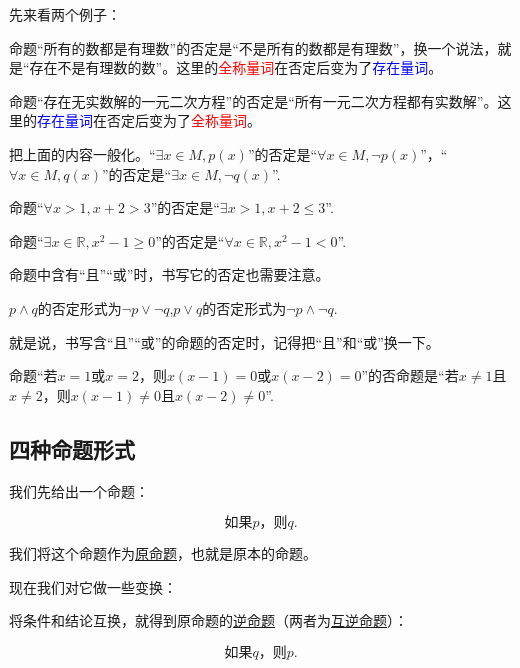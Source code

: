 \documentclass[lang=cn,math=cm,chinesefont=nofont,11pt,scheme=chinese,twocol]{elegantbook}
\begin{document}
先来看两个例子：

命题“所有的数都是有理数”的否定是“不是所有的数都是有理数”，换一个说法，就是“存在不是有理数的数”。这里的\textcolor{red}{全称量词}在否定后变为了\textcolor{blue}{存在量词}。

命题“存在无实数解的一元二次方程”的否定是“所有一元二次方程都有实数解”。这里的\textcolor{blue}{存在量词}在否定后变为了\textcolor{red}{全称量词}。

把上面的内容一般化。“$\exists x\in M, p(x)$”的否定是“$\forall x{\in}M,\neg p(x)$”，“$\forall x\in M, q(x)$”的否定是“$\exists x{\in}M, \neg q(x)$”.

\begin{example}
  命题“$\forall x>1,x+2>3$”的否定是“$\exists x>1,x+2\leqslant 3$”.
\end{example}

\begin{example}
  命题“$\exists x\in\mathbb{R},x^2-1\geqslant 0$”的否定是“$\forall x\in\mathbb{R},x^2-1<0$”.
\end{example}

命题中含有“且”“或”时，书写它的否定也需要注意。

$p\land q$的否定形式为$\lnot p\lor \lnot q$,$p\lor q$的否定形式为$\lnot p\land \lnot q$.

就是说，书写含“且”“或”的命题的否定时，记得把“且”和“或”换一下。

\begin{example}
  命题“若$x=1$或$x=2$，则$x(x-1)=0$或$x(x-2)=0$”的否命题是“若$x\neq 1$且$x\neq 2$，则$x(x-1)\neq 0$且$x(x-2)\neq 0$”.
\end{example}

\subsection{四种命题形式}

我们先给出一个命题：

\begin{equation}\label{YuanMingTi}
  \text{如果}p\text{，则}q.
\end{equation}

我们将这个命题作为\underline{原命题}，也就是原本的命题。

现在我们对它做一些变换：

将条件和结论互换，就得到原命题的\underline{逆命题}（两者为\underline{互逆命题}）：

\begin{equation}\label{NiMingTi}
  \text{如果}q\text{，则}p.
\end{equation}
\end{document}
